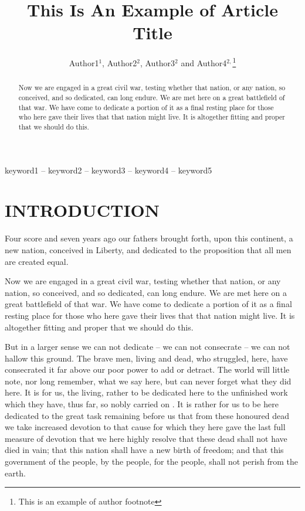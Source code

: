\documentclass{pasa}%
\title[This Is An Example of Short Title]{This Is An Example of Article Title}
\author[Author1 et al.]{Author1$^1$, Author2$^2$, Author3$^2$ and Author4$^{2,}$\thanks{This is an example of author footnote}
\affil{$^1$This is  an example of Affiliation r Author 1}%
\affil{$^2$This is  an example of Affiliation for Author 2}
}%
\begin{document}
\begin{frontmatter}
\maketitle

\begin{abstract}
Now we are engaged in a great civil war, testing whether that nation, or any nation, so conceived, and so dedicated, can long endure. We are met here on a great battlefield of that war. We have come to dedicate a portion of it as a final resting place for those who here gave their lives that that nation might live. It is altogether fitting and proper that we should do this.
\end{abstract}

\begin{keywords}
keyword1 -- keyword2 -- keyword3 -- keyword4 -- keyword5
\end{keywords}
\end{frontmatter}


\section{INTRODUCTION }
\label{sec:intro}

Four score and seven years ago our fathers brought forth, upon this continent, a new nation, conceived in Liberty, and dedicated to the proposition that all men are created equal.

Now we are engaged in a great civil war, testing whether that nation, or any nation, so conceived, and so dedicated, can long endure. We are met here on a great battlefield of that war. We have come to dedicate a portion of it as a final resting place for those who here gave their lives that that nation might live. It is altogether fitting and proper that we should do this.

But in a larger sense we can not dedicate -- we can not consecrate -- we can not hallow this ground. The brave men, living and dead, who struggled, here, have consecrated it far above our poor power to add or detract. The world will little note, nor long remember, what we say here, but can never forget what they did here. It is for us, the living, rather to be dedicated here to the unfinished work which they have, thus far, so nobly carried on \cite{abt1961}. It is rather for us to be here dedicated to the great task remaining before us  that from these honoured dead we take increased devotion to that cause for which they here gave the last full measure of devotion  that we here highly resolve that these dead shall not have died in vain; that this nation shall have a new birth of freedom; and that this government \cite{abt1961} of the people, by the people, for the people, shall not perish from the earth.
\end{document}
